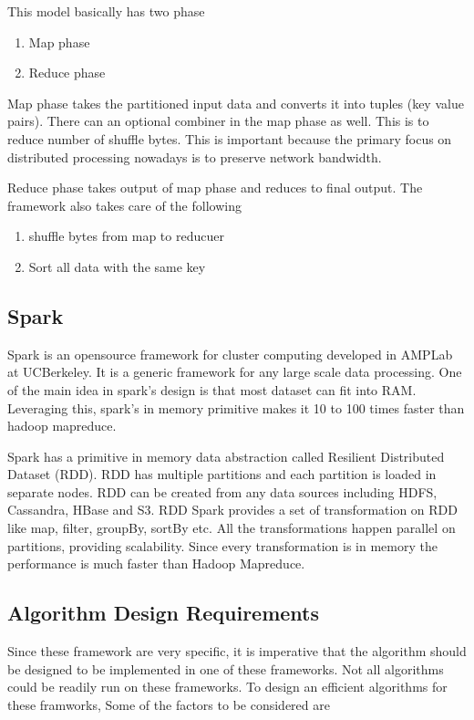 \documentclass[conference]{IEEEtran}
\begin{document}
This model basically has two phase
\begin{enumerate}
\item Map phase
\item Reduce phase
\end{enumerate}

Map phase takes the partitioned input data and converts it into tuples (key value
pairs). There can an optional combiner in the map phase as well. This
is to reduce number of shuffle bytes. This is important because the
primary focus on distributed processing nowadays is to preserve
network bandwidth.

\medskip

Reduce phase takes output of map phase and reduces to final
output. The framework also takes care of the following
\begin{enumerate}
\item shuffle bytes from map to reducuer
\item Sort all data with the same key
\end{enumerate}

\subsection{Spark}
Spark is an opensource framework for cluster computing developed in
AMPLab at UCBerkeley. It is a generic framework for any large scale
data processing. One of the main idea in spark's design is that most
dataset can fit into RAM. Leveraging this, spark's in memory primitive
makes it 10 to 100 times faster than hadoop mapreduce.

\medskip

Spark has a primitive in memory data abstraction called Resilient Distributed
Dataset (RDD). RDD has multiple partitions and each partition is
loaded in separate nodes. RDD can be created from any data sources including
HDFS, Cassandra, HBase and S3. RDD Spark provides a set of transformation on
RDD like map, filter, groupBy, sortBy etc. All the transformations
happen parallel on partitions, providing scalability. Since every transformation
is in memory the performance is much faster than Hadoop Mapreduce.

\subsection{Algorithm Design Requirements}

Since these framework are very specific, it is imperative that the
algorithm should be designed to be implemented in one of these
frameworks. Not all algorithms could be readily run on these
frameworks. To design an efficient algorithms for these framworks,
Some of the factors to be considered are
\end{document}
